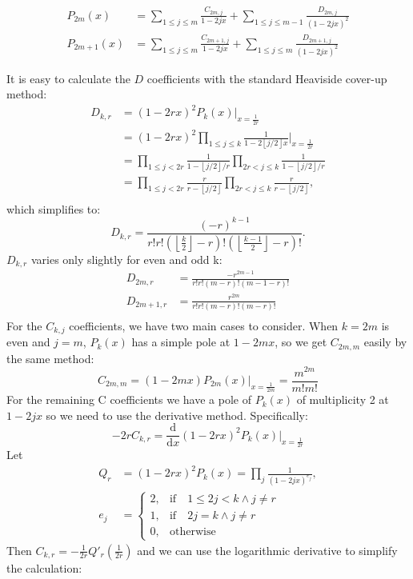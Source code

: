 \documentclass{article}
\newcommand{\floor}[1]{\left\lfloor #1 \right\rfloor}
\begin{document}
\begin{equation}\label{pkx}
    \begin{aligned}
    P_{2m}(x) &= \sum_{1 \leq j \leq m} \frac{C_{2m,j}}{1-2jx} + \sum_{1 \leq j \leq m-1} \frac{D_{2m,j}}{(1-2jx)^2} \\
    P_{2m+1}(x) &= \sum_{1 \leq j \leq m} \frac{C_{2m+1,j}}{1-2jx} + \sum_{1 \leq j \leq m} \frac{D_{2m+1,j}}{(1-2jx)^2}
    \end{aligned}
\end{equation}

It is easy to calculate the $D$ coefficients with the standard Heaviside cover-up method:
$$
\begin{aligned}
    D_{k,r} &= (1-2rx)^2P_k(x)|_{x=\frac{1}{2r}} \\
    &= (1-2rx)^2 \prod_{1 \leq j \leq k} \frac{1}{1-2 \floor{j/2}x} \bigg|_{x=\frac{1}{2r}} \\
    &= \prod_{1 \leq j < 2r} \frac{1}{1-\floor{j/2}/r} \prod_{2r < j \leq k} \frac{1}{1- \floor{j/2}/r} \\
    &= \prod_{1 \leq j < 2r} \frac{r}{r-\floor{j/2}} \prod_{2r < j \leq k} \frac{r}{r- \floor{j/2}}, \\
\end{aligned}
$$
which simplifies to:
\begin{equation}\label{d-k-r}
        D_{k,r}=\frac{(-r)^{k-1}}{r!r!(\floor{\frac{k}{2}}-r)!(\floor{\frac{k-1}{2}}-r)!}.
\end{equation}
$D_{k,r}$ varies only slightly for even and odd k:
$$
\begin{aligned}
    D_{2m,r} &= \frac{-r^{2m-1}}{r!r!(m-r)!(m-1-r)!} \\
    D_{2m+1,r} &= \frac{r^{2m}}{r!r!(m-r)!(m-r)!} \\
\end{aligned}
$$
For the $C_{k,j}$ coefficients, we have two main cases to consider. When $k=2m$ is even and $j=m$, $P_k(x)$ has a simple pole at $1-2mx$, so we get $C_{2m,m}$ easily by the same method:
\begin{equation}\label{c-2m-m}
    C_{2m,m} = (1-2mx)P_{2m}(x)|_{x=\frac{1}{2m}} = \frac{m^{2m}}{m!m!}
\end{equation}
For the remaining C coefficients  we have a pole of $P_k(x)$ of multiplicity 2 at $1-2jx$ so we need to use the derivative method. Specifically:
$$
-2r C_{k,r} = \frac{\mathrm{d}}{\mathrm{d}x} (1-2rx)^2P_k(x)\bigg|_{x=\frac{1}{2r}}
$$
Let 
$$
\begin{aligned}
Q_r &= (1-2rx)^2 P_k(x) = \prod_{j} \frac{1}{(1-2jx)^{e_j}},\\
e_j &= 
    \begin{cases} 
    2,& \mathrm{if}\quad 1 \leq 2j < k \land  j \neq r \\ 
    1, & \mathrm{if} \quad 2j = k \land j \neq r \\
    0, & \mathrm{otherwise}
    \end{cases}
\end{aligned}
$$
Then $C_{k,r} = -\frac{1}{2r}Q'_r\left (\frac{1}{2r} \right)$ and we can use the logarithmic derivative to simplify the calculation:
\end{document}
